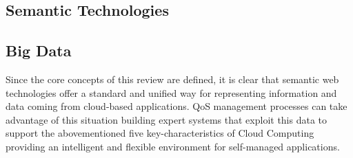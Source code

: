 \subsection{Semantic Technologies}

\subsection{Big Data}



Since the core concepts of this review are defined, it is clear that semantic
web technologies offer a standard and unified way for representing information
and data coming from cloud-based applications. QoS management processes can 
take advantage of this situation building expert systems that exploit this data to support the abovementioned five
key-characteristics of Cloud Computing providing an intelligent and flexible environment for
self-managed applications.

